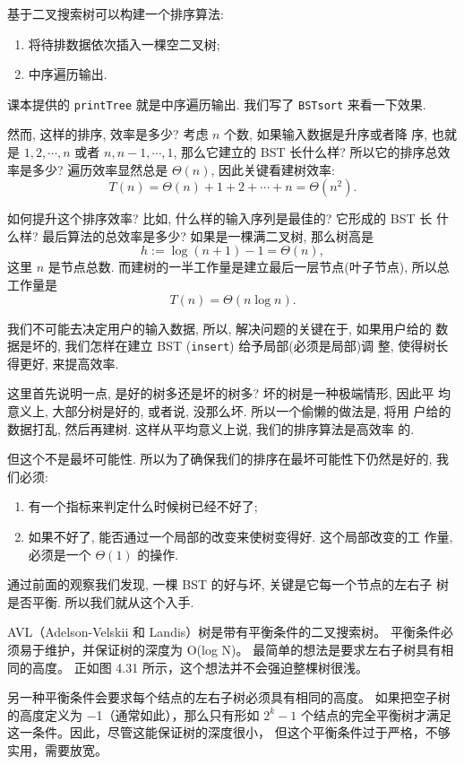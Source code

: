 \documentclass[a4paper]{ctexart}
\theoremstyle{definition}
\theoremstyle{definition}
\begin{document}
基于二叉搜索树可以构建一个排序算法:

\begin{enumerate}
\item 将待排数据依次插入一棵空二叉树;
\item 中序遍历输出.
\end{enumerate}

课本提供的 \verb|printTree| 就是中序遍历输出. 我们写了 \verb|BSTsort|
来看一下效果.

然而, 这样的排序, 效率是多少? 考虑 $n$ 个数, 如果输入数据是升序或者降
序, 也就是 $1, 2, \cdots, n$ 或者 $n, n - 1, \cdots, 1$, 那么它建立的
BST 长什么样? 所以它的排序总效率是多少? 遍历效率显然总是 $\Theta(n)$,
因此关键看建树效率:
$$
T(n) = \Theta(n) + 1 + 2 + \cdots + n = \Theta(n^2).
$$

如何提升这个排序效率? 比如, 什么样的输入序列是最佳的? 它形成的 BST 长
什么样? 最后算法的总效率是多少? 如果是一棵满二叉树, 那么树高是
$$
h :=\log (n + 1) - 1 = \Theta(n),
$$
这里 $n$ 是节点总数. 而建树的一半工作量是建立最后一层节点(叶子节点), 所以总工作量是
$$
T(n) = \Theta(n\log n).
$$

我们不可能去决定用户的输入数据, 所以, 解决问题的关键在于, 如果用户给的
数据是坏的, 我们怎样在建立 BST (\verb|insert|) 给予局部(必须是局部)调
整, 使得树长得更好, 来提高效率.

这里首先说明一点, 是好的树多还是坏的树多? 坏的树是一种极端情形, 因此平
均意义上, 大部分树是好的, 或者说, 没那么坏. 所以一个偷懒的做法是, 将用
户给的数据打乱, 然后再建树. 这样从平均意义上说, 我们的排序算法是高效率
的.

但这个不是最坏可能性. 所以为了确保我们的排序在最坏可能性下仍然是好的,
我们必须:

\begin{enumerate}
\item 有一个指标来判定什么时候树已经不好了;
\item 如果不好了, 能否通过一个局部的改变来使树变得好. 这个局部改变的工
  作量, 必须是一个 $\Theta(1)$ 的操作.
\end{enumerate}

通过前面的观察我们发现, 一棵 BST 的好与坏, 关键是它每一个节点的左右子
树是否平衡. 所以我们就从这个入手. 

AVL（Adelson-Velskii 和 Landis）树是带有平衡条件的二叉搜索树。
平衡条件必须易于维护，并保证树的深度为 O(log N)。
最简单的想法是要求左右子树具有相同的高度。
正如图 4.31 所示，这个想法并不会强迫整棵树很浅。

另一种平衡条件会要求每个结点的左右子树必须具有相同的高度。
如果把空子树的高度定义为 −1（通常如此），那么只有形如 $2^k − 1$ 
个结点的完全平衡树才满足这一条件。因此，尽管这能保证树的深度很小，
但这个平衡条件过于严格，不够实用，需要放宽。
\end{document}

